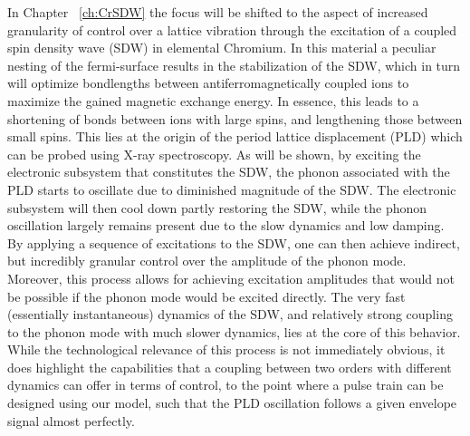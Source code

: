 In Chapter ~\ref{ch:CrSDW} the focus will be shifted to the aspect of increased granularity of control over a lattice vibration through the excitation of a coupled spin density wave (SDW) in elemental Chromium.
In this material a peculiar nesting of the fermi-surface results in the stabilization of the SDW, which in turn will optimize bondlengths between antiferromagnetically coupled ions to maximize the gained magnetic exchange energy.
In essence, this leads to a shortening of bonds between ions with large spins, and lengthening those between small spins. This lies at the origin of the period lattice displacement (PLD) which can be probed using X-ray spectroscopy.
As will be shown, by exciting the electronic subsystem that constitutes the SDW, the phonon associated with the PLD starts to oscillate due to diminished magnitude of the SDW.
The electronic subsystem will then cool down partly restoring the SDW, while the phonon oscillation largely remains present due to the slow dynamics and low damping.
By applying a sequence of excitations to the SDW, one can then achieve indirect, but incredibly granular control over the amplitude of the phonon mode.
Moreover, this process allows for achieving excitation amplitudes that would not be possible if the phonon mode would be excited directly.
The very fast (essentially instantaneous) dynamics of the SDW, and relatively strong coupling to the phonon mode with much slower dynamics, lies at the core of this behavior.
While the technological relevance of this process is not immediately obvious, it does highlight the capabilities that a coupling between two orders with different dynamics can offer in terms of control, to the point where a pulse train can be designed using our model, such that the PLD oscillation follows a given envelope signal almost perfectly.

